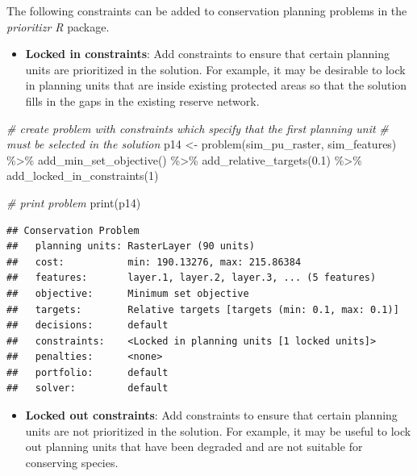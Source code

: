 \documentclass[
  12pt,
]{book}
\newenvironment{Shaded}{\begin{snugshade}}{\end{snugshade}}
\newcommand{\CommentTok}[1]{\textcolor[rgb]{0.56,0.35,0.01}{\textit{#1}}}
\newcommand{\DecValTok}[1]{\textcolor[rgb]{0.00,0.00,0.81}{#1}}
\newcommand{\FloatTok}[1]{\textcolor[rgb]{0.00,0.00,0.81}{#1}}
\newcommand{\FunctionTok}[1]{\textcolor[rgb]{0.00,0.00,0.00}{#1}}
\newcommand{\NormalTok}[1]{#1}
\newcommand{\OtherTok}[1]{\textcolor[rgb]{0.56,0.35,0.01}{#1}}
\newcommand{\SpecialCharTok}[1]{\textcolor[rgb]{0.00,0.00,0.00}{#1}}
\providecommand{\tightlist}{%
  \setlength{\itemsep}{0pt}\setlength{\parskip}{0pt}}
\begin{document}
The following constraints can be added to conservation planning problems in the \emph{prioritizr R} package.

\begin{itemize}
\tightlist
\item
  \textbf{Locked in constraints}: Add constraints to ensure that certain planning units are prioritized in the solution. For example, it may be desirable to lock in planning units that are inside existing protected areas so that the solution fills in the gaps in the existing reserve network.
\end{itemize}

\begin{Shaded}
\begin{Highlighting}[]
\CommentTok{\# create problem with constraints which specify that the first planning unit}
\CommentTok{\# must be selected in the solution}
\NormalTok{p14 }\OtherTok{\textless{}{-}} \FunctionTok{problem}\NormalTok{(sim\_pu\_raster, sim\_features) }\SpecialCharTok{\%\textgreater{}\%}
  \FunctionTok{add\_min\_set\_objective}\NormalTok{() }\SpecialCharTok{\%\textgreater{}\%}
  \FunctionTok{add\_relative\_targets}\NormalTok{(}\FloatTok{0.1}\NormalTok{) }\SpecialCharTok{\%\textgreater{}\%}
  \FunctionTok{add\_locked\_in\_constraints}\NormalTok{(}\DecValTok{1}\NormalTok{)}

\CommentTok{\# print problem}
\FunctionTok{print}\NormalTok{(p14)}
\end{Highlighting}
\end{Shaded}

\begin{verbatim}
## Conservation Problem
##   planning units: RasterLayer (90 units)
##   cost:           min: 190.13276, max: 215.86384
##   features:       layer.1, layer.2, layer.3, ... (5 features)
##   objective:      Minimum set objective 
##   targets:        Relative targets [targets (min: 0.1, max: 0.1)]
##   decisions:      default
##   constraints:    <Locked in planning units [1 locked units]>
##   penalties:      <none>
##   portfolio:      default
##   solver:         default
\end{verbatim}

\begin{itemize}
\tightlist
\item
  \textbf{Locked out constraints}: Add constraints to ensure that certain planning units are not prioritized in the solution. For example, it may be useful to lock out planning units that have been degraded and are not suitable for conserving species.
\end{itemize}
\end{document}
